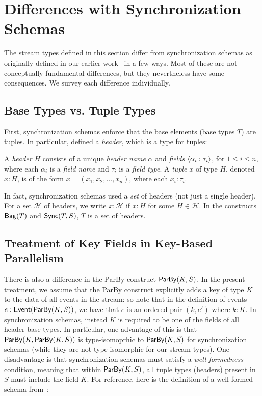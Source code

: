 
\section{Differences with Synchronization Schemas}

The stream types defined in this section differ from synchronization schemas as originally defined in our earlier work~
in a few ways. Most of these are not conceptually fundamental differences, but they nevertheless have some consequences. We survey each difference individually.

\subsection{Base Types vs. Tuple Types}

First, synchronization schemas enforce that the base elements (base types $T$) are tuples.
In particular,  defined a \emph{header}, which is a type for tuples:
\begin{definition}
A \emph{header} $H$
consists of a unique \emph{header name} \(\alpha\)
and \emph{fields} \(\left\langle\alpha_i: \tau_i\right\rangle\), for $1\le i\le n$,
where each \(\alpha_i\) is a \emph{field name}
and \(\tau_i\) is a \emph{field type}.
A \emph{tuple} $x$ of type \(H\), denoted $x : H$, is of the form
\(x = (x_1, x_2, \ldots, x_n)\), where each \(x_i : \tau_i\).
\end{definition}

In fact, synchronization schemas used a \emph{set} of headers (not just a single header).
For a set $\mathcal{H}$ of headers, we write
$x: \mathcal{H}$ if $x : H$ for some $H \in \mathcal{H}$.
In the constructs $\mathsf{Bag}({T})$ and $\mathsf{Sync}({T}, S)$,
$T$ is a set of headers.

\subsection{Treatment of Key Fields in Key-Based Parallelism}

There is also a difference in the ParBy construct $\mathsf{ParBy}({K}, S)$.
In the present treatment, we assume that the ParBy construct explicitly adds a key of type $K$ to the data of all events in the stream: so note that in the definition of events $e: \mathsf{Event}({\mathsf{ParBy}({K}, S)})$, we have that $e$ is an ordered pair $(k, e')$
where $k: K$.
In synchronization schemas, instead $K$ is required to be one of the fields of all header base types.
In particular, one advantage of this is that $\mathsf{ParBy}({K}, \mathsf{ParBy}({K}, S))$ is type-isomoprhic to $\mathsf{ParBy}({K}, S)$ for synchronization schemas (while they are not type-isomorphic for our stream types).
One disadvantage is that synchronization schemas must satisfy a \emph{well-formedness} condition, meaning that within $\mathsf{ParBy}({K}, S)$, all tuple types (headers) present in $S$ must include the field $K$.
For reference, here is the definition of a well-formed schema from~:

